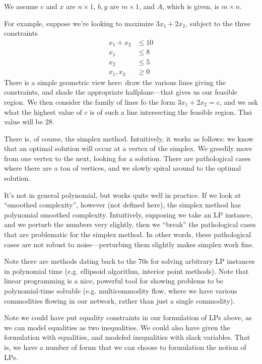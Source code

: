 \documentclass{article}
\begin{document}
We assume $c$ and $x$ are $n\times 1$, $b,y$ are $m\times 1$, and
$A$, which is given, is $m\times n$.

For example, suppose we're looking to maximize $3x_1 + 2x_2$, subject
to the three constraints
\begin{align*}
	x_1 + x_2 & \leq 10 \\
	x_1 & \leq 8 \\
	x_2 & \leq 5 \\
	x_1, x_2 &\geq 0
\end{align*}
There is a simple geometric view here: draw the various lines giving
the constraints, and shade the appropriate halfplane---that gives us our 
feasible region.
We then consider the family of lines fo the form $3x_1 + 2x_2 = c$, and we
ask what the highest value of $c$ is of such a line intersecting the feasible 
region.
Thsi value will be 28.

There is, of course, the simplex method.
Intuitively, it works as follows: we know that an optimal solution will occur
at a vertex of the simplex. We greedily move from one vertex to the next, 
looking for a solution.
There are pathological cases where there are a ton of vertices, and we slowly
spiral around to the optimal solution.

It's not in general polynomial, but works quite well in practice.
If we look at ``smoothed complexity'', however (not defined here), the
simplex method has polynomial smoothed complexity.
Intuitively, supposing we take an LP instance, and we perturb the numbers
very slightly, then we ``break'' the pathological cases that are problematic
for the simplex method. In other words, these pathological cases are not
robust to noise---perturbing them slightly  makes simplex work fine.

Note there are methods dating back to the 70s for solving arbitrary LP 
instances in polynomial time (e.g. ellipsoid algorithm, interior
point methods).
Note that linear programming is a nice, powerful tool for showing problems
to be polynomial-time solvable (e.g. multicommodity flow, where we have 
various commodities flowing in our network, rather than just a single
commodity).

Note we could have put equality constraints in our formulation of LPs above,
as we can model equalities as two inequalities.
We could also have given the formulation with equalities, and modeled
inequalities with slack variables.
That is, we have a number of forms that we can choose to formulation
the notion of LPs.
\end{document}
